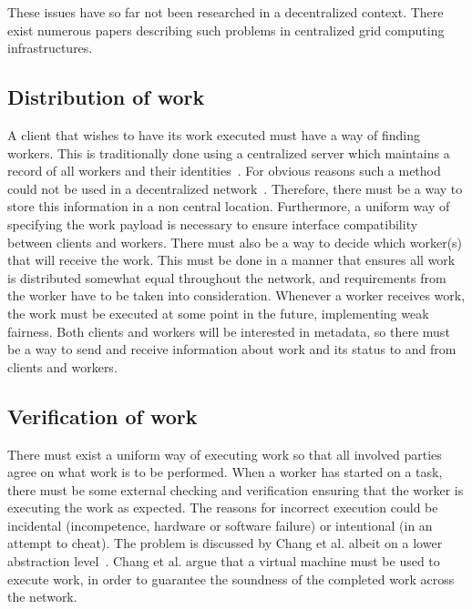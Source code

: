 These issues have so far not been researched in a decentralized context. There exist numerous papers describing such problems in centralized grid computing infrastructures. 

\subsection{Distribution of work}
\label{sec:prob:distribution}
A client that wishes to have its work executed must have a way of finding workers. This is traditionally done using a centralized server which maintains a record of all workers and their identities~\cite{anderson:2005}\cite{sarmenta:2002}. For obvious reasons such a method could not be used in a decentralized network~\cite{baran}. Therefore, there must be a way to store this information in a non central location. Furthermore, a uniform way of specifying the work payload is necessary to ensure interface compatibility between clients and workers. There must also be a way to decide which worker(s) that will receive the work. This must be done in a manner that ensures all work is distributed somewhat equal throughout the network, and requirements from the worker have to be taken into consideration. Whenever a worker receives work, the work must be executed at some point in the future, implementing weak fairness. Both clients and workers will be interested in metadata, so there must be a way to send and receive information about work and its status to and from clients and workers.

\subsection{Verification of work}
\label{sec:prob:verification}
There must exist a uniform way of executing work so that all involved parties agree on what work is to be performed. When a worker has started on a task, there must be some external checking and verification ensuring that the worker is executing the work as expected. The reasons for incorrect execution could be incidental (incompetence, hardware or software failure) or intentional (in an attempt to cheat). The problem is discussed by Chang et al. albeit on a lower abstraction level~\cite{chang:2002}. Chang et al. argue that a virtual machine must be used to execute work, in order to guarantee the soundness of the completed work across the network.

